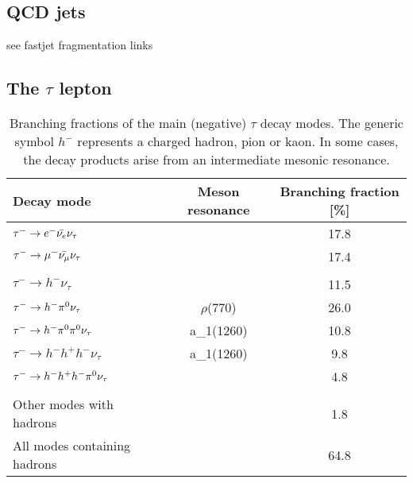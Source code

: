 \label{sec:conserved_quantities}

\subsection{QCD jets}
\label{sec:qcd_jets}
see fastjet fragmentation links
\subsection{The $\tau$ lepton}
\label{sec:the_tau_lepton}

\begin{table}[]
    \centering
    \begin{tabular}{l c c}
        \hline
         Decay mode & Meson resonance & Branching fraction [\%] \\
         \hline
         $\tau^- \rightarrow e^- \Bar{\nu_e} \nu_\tau$ & & 17.8 \\
         $\tau^- \rightarrow \mu^- \Bar{\nu_\mu} \nu_\tau$ & & 17.4 \\
         & &  \\
         $\tau^- \rightarrow h^- \nu_\tau$ & & 11.5 \\
         $\tau^- \rightarrow h^- \pi^{0} \nu_\tau$ & $\rho$(770) & 26.0 \\
         $\tau^- \rightarrow h^- \pi^{0} \pi^{0} \nu_\tau$ & a_1(1260) & 10.8 \\
         $\tau^- \rightarrow h^- h^+ h^- \nu_\tau$ & a_1(1260) & 9.8 \\
         $\tau^- \rightarrow h^- h^+ h^- \pi^{0} \nu_\tau$ & & 4.8 \\
         & &  \\
         Other modes with hadrons & & 1.8 \\
         All modes containing hadrons & & 64.8 \\
         \hline
    \end{tabular}
    \caption{Branching fractions of the main (negative) $\tau$ decay modes. The generic symbol $h^-$ represents a charged hadron, pion or kaon. In some cases, the decay products arise from an intermediate mesonic resonance.}
    \label{tab:tau_decay_products}
\end{table}
